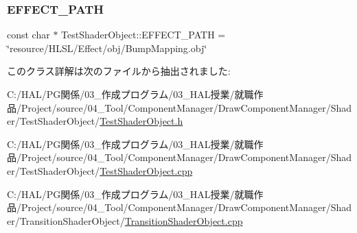 \subsubsection{\texorpdfstring{E\+F\+F\+E\+C\+T\+\_\+\+P\+A\+TH}{EFFECT\_PATH}}
{\footnotesize\ttfamily const char $\ast$ Test\+Shader\+Object\+::\+E\+F\+F\+E\+C\+T\+\_\+\+P\+A\+TH = \char`\"{}resource/H\+L\+SL/Effect/obj/Bump\+Mapping.\+obj\char`\"{}\hspace{0.3cm}{\ttfamily [static]}}



このクラス詳解は次のファイルから抽出されました\+:\begin{DoxyCompactItemize}
\item 
C\+:/\+H\+A\+L/\+P\+G関係/03\+\_\+作成プログラム/03\+\_\+\+H\+A\+L授業/就職作品/\+Project/source/04\+\_\+\+Tool/\+Component\+Manager/\+Draw\+Component\+Manager/\+Shader/\+Test\+Shader\+Object/\mbox{\hyperlink{_test_shader_object_8h}{Test\+Shader\+Object.\+h}}\item 
C\+:/\+H\+A\+L/\+P\+G関係/03\+\_\+作成プログラム/03\+\_\+\+H\+A\+L授業/就職作品/\+Project/source/04\+\_\+\+Tool/\+Component\+Manager/\+Draw\+Component\+Manager/\+Shader/\+Test\+Shader\+Object/\mbox{\hyperlink{_test_shader_object_8cpp}{Test\+Shader\+Object.\+cpp}}\item 
C\+:/\+H\+A\+L/\+P\+G関係/03\+\_\+作成プログラム/03\+\_\+\+H\+A\+L授業/就職作品/\+Project/source/04\+\_\+\+Tool/\+Component\+Manager/\+Draw\+Component\+Manager/\+Shader/\+Transition\+Shader\+Object/\mbox{\hyperlink{_transition_shader_object_8cpp}{Transition\+Shader\+Object.\+cpp}}\end{DoxyCompactItemize}
